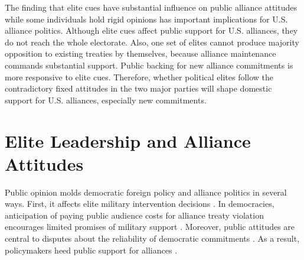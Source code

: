 \documentclass[12pt]{article}
\begin{document}
The finding that elite cues have substantial influence on public alliance attitudes while some individuals hold rigid opinions has important implications for U.S. alliance politics. 
Although elite cues affect public support for U.S. alliances, they do not reach the whole electorate.
Also, one set of elites cannot produce majority opposition to existing treaties by themselves, because alliance maintenance commands substantial support. 
Public backing for new alliance commitments is more responsive to elite cues. 
Therefore, whether political elites follow the contradictory fixed attitudes in the two major parties will shape domestic support for U.S. alliances, especially new commitments.



\section{Elite Leadership and Alliance Attitudes}


Public opinion molds democratic foreign policy and alliance politics in several ways.
First, it affects elite military intervention decisions \citep{Tomzetal2020, LinGreenberg2021}. 
In democracies, anticipation of paying public audience costs for alliance treaty violation encourages limited promises of military support \citep{Chibaetal2015, FjelstulReiter2019}. 
Moreover, public attitudes are central to disputes about the reliability of democratic commitments \citep{Gaubatz1996, GartzkeGleditsch2004}. 
As a result, policymakers heed public support for alliances \citep{Sayle2019}. 


%
%
\end{document}
